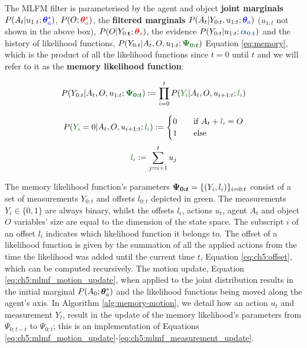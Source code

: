 The MLFM filter is parameterised by the agent and object 
\textbf{joint marginals} $P(A_t|u_{1_:t};\mathcolor{blue}{\ThAs})$, $P(O;\mathcolor{red}{\ThOs})$, the \textbf{filtered marginals}  
$P(A_t|Y_{0:t},u_{1:t};\mathcolor{blue}{\ThA})$ ($u_{1:t}$ not shown in the above box), $P(O|Y_{0:\mathbf{t}};\mathcolor{red}{\ThO})$, 
the evidence $P(Y_{0:t}|u_{1:t};\mathcolor{dark-blue}{\BAlph})$ and the history of likelihood functions, $P(Y_{0:t}|A_t,O,u_{1:t};\mathcolor{dark-green}{\BPsi})$ Equation \ref{eq:memory}, which is 
the product of all the likelihood functions since $t=0$ until $t$ and we will refer to it as the \textbf{memory likelihood function}: 

\begin{equation}
 P(Y_{0:t}|A_t,O,u_{1:t};\mathcolor{dark-green}{\BPsi}) := \prod_{i=0}^t P(\mathcolor{dark-green}{Y_i}|A_t,O,u_{i+1:t};\mathcolor{dark-green}{l_i}) \label{eq:memory}
\end{equation}

\begin{equation} \label{eq:ch5:liklihood_v2}
P(\mathcolor{dark-green}{Y_i}=0|A_t,O,u_{i+1:t};\mathcolor{dark-green}{l_i}) :=
  \begin{cases}
    0       & \quad \text{if } A_t + \mathcolor{dark-green}{l_i} = O     \\
    1  	    & \quad \text{else}  \\
  \end{cases}
\end{equation}
\begin{equation}
  \mathcolor{dark-green}{l_i} := \sum\limits_{j=i+1}^t u_j  \label{eq:ch5:offset}
\end{equation}

The memory likelihood function's parameters $\boldsymbol{\Psi_{0:t}} = \{(Y_i,l_i)\}_{i=0:t}$ consist of a set of measurements $Y_{0:t}$ and offsets $l_{0:t}$
depicted in green. The measurements $Y_i \in \{0,1\}$ are always binary, whilst the offsets $l_i$, actions $u_t$, 
agent $A_t$ and object $O$ variables' size are equal to the dimension of the state space. The subscript $i$ 
of an offset $l_i$ indicates which likelihood function it belongs to. The offset of a likelihood function is given by the 
summation of all the applied actions from the time the likelihood was added until the current time $t$, Equation \ref{eq:ch5:offset}, which can be computed recursively.
The motion update, Equation \ref{eq:ch5:mlmf_motion_update}, when applied to the joint distribution results in the 
initial marginal $P(A_0;\boldsymbol{\theta}^*_a)$ and the likelihood functions being moved along the agent's axis. In Algorithm \ref{alg:memory-motion}, we detail how an action $u_t$ and measurement $Y_t$, result in the update of
the memory likelihood's parameters from $\Psi_{0:t-t}$ to $\Psi_{0:t}$; this is an implementation of 
Equations \ref{eq:ch5:mlmf_motion_update}-\ref{eq:ch5:mlmf_measurement_update}.


